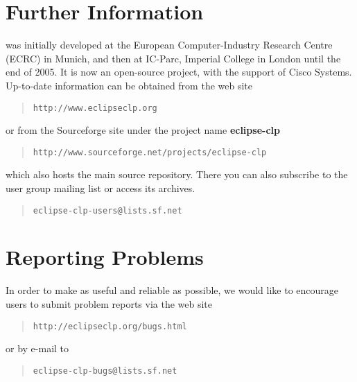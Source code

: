 
\section{Further Information}
{\eclipse} was initially developed at the European Computer-Industry
Research Centre (ECRC) in Munich, and then at IC-Parc, Imperial College in London
until the end of 2005. It is now an open-source project, with the
support of Cisco Systems.
Up-to-date information can be obtained from the {\eclipse} web site
\begin{quote}
\begin{verbatim}
http://www.eclipseclp.org
\end{verbatim}
\end{quote}
or from the Sourceforge site under the project name {\bf eclipse-clp}
\begin{quote}
\begin{verbatim}
http://www.sourceforge.net/projects/eclipse-clp
\end{verbatim}
\end{quote}
which also hosts the main source repository.
There you can also subscribe to the {\eclipse} user group mailing list
or access its archives.%
%
\begin{quote}
\begin{verbatim}
eclipse-clp-users@lists.sf.net
\end{verbatim}
\end{quote}

\section{Reporting Problems}
In order to make {\eclipse} as useful and reliable as possible,
we would like to encourage users to submit problem reports via the web site
\begin{quote}
\begin{verbatim}
http://eclipseclp.org/bugs.html
\end{verbatim}
\end{quote}
or by e-mail to
\begin{quote}
\begin{verbatim}
eclipse-clp-bugs@lists.sf.net
\end{verbatim}
\end{quote}
